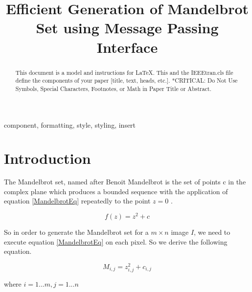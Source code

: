 \documentclass[conference]{IEEEtran}
\begin{document}
	
	\title{Efficient Generation of Mandelbrot Set using Message Passing Interface}
	
	\author{
	}
	\maketitle
	
	\begin{abstract}
		This document is a model and instructions for \LaTeX.
		This and the IEEEtran.cls file define the components of your paper [title, text, heads, etc.]. *CRITICAL: Do Not Use Symbols, Special Characters, Footnotes, 
		or Math in Paper Title or Abstract.
	\end{abstract}
	
	\begin{IEEEkeywords}
		component, formatting, style, styling, insert
	\end{IEEEkeywords}
	
	\section{Introduction}

	The Mandelbrot set, named after Benoit Mandelbrot is the set of points c in the complex plane which produces a bounded sequence with the application of equation \ref{MandelbrotEq} repeatedly to the point $z=0$ \cite{Mandelbrotset}.
	
	\begin{equation}
		f(z)=z^{2} + c \label{MandelbrotEq}
	\end{equation}
	
	So in order to generate the Mandelbrot set for a $m \times n$ image $I$, we need to execute equation \ref{MandelbrotEq} on each pixel. So we derive the following equation.
	
	\begin{equation}
				M_{i,j} = z_{i,j}^2 + c_{i,j}  \label{MandelPixel}
	\end{equation}
	
	\begin{center}
	where $i = 1...m, j = 1...n$
	\end{center}
\end{document}
